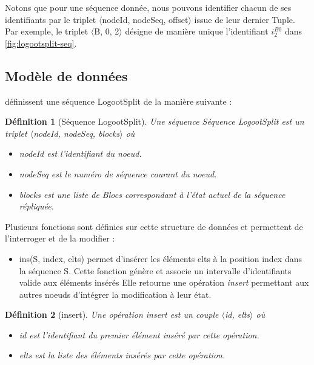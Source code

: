 \documentclass[12pt]{thesul}
\newtheorem{definition}{Définition}
\newcommand{\trm}[1]{\mathit{#1}}
\newcommand{\id}[3]{$\trm{#1}^{\trm{#2}}_{\trm{#3}}$}
\begin{document}
Notons que pour une séquence donnée, nous pouvons identifier chacun de ses identifiants par le triplet $\langle$nodeId, nodeSeq, offset$\rangle$ issue de leur dernier Tuple.
Par exemple, le triplet $\langle$B, 0, 2$\rangle$ désigne de manière unique l'identifiant \id{i}{B0}{2} dans \autoref{fig:logootsplit-seq}.

\subsection{Modèle de données}

\textcite{2013-logootsplit} définissent une séquence LogootSplit de la manière suivante :

\begin{definition}[Séquence LogootSplit]
  \label{def:logootsplit}
  Une séquence \emph{Séquence LogootSplit} est un triplet $\langle$nodeId, nodeSeq, blocks$\rangle$ où
  \begin{itemize}
    \item nodeId est l'identifiant du noeud.
    \item nodeSeq est le numéro de séquence courant du noeud.
    \item blocks est une liste de Blocs correspondant à l'état actuel de la séquence répliquée.
  \end{itemize}
\end{definition}

Plusieurs fonctions sont définies sur cette structure de données et permettent de l'interroger et de la modifier :

\begin{itemize}
  \item ins(S, index, elts) permet d'insérer les éléments elts à la position index dans la séquence S.
    Cette fonction génère et associe un intervalle d'identifiants valide aux éléments insérés
    Elle retourne une opération \emph{insert} permettant aux autres noeuds d'intégrer la modification à leur état.
\end{itemize}

\begin{definition}[insert]
  Une opération \emph{insert} est un couple $\langle$id, elts$\rangle$ où
  \begin{itemize}
    \item id est l'identifiant du premier élément inséré par cette opération.
    \item elts est la liste des éléments insérés par cette opération.
  \end{itemize}
\end{definition}
\end{document}
